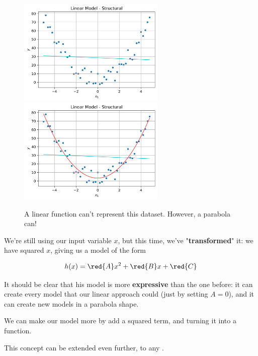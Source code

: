         \begin{figure}[H]
            
            \includegraphics[width=70mm,scale=0.5]{images/feature_images/Structural_Linear_Model.png}
            \includegraphics[width=70mm,scale=0.5]{images/feature_images/Structural_Quad_Model.png}
    
            \caption{A linear function can't represent this dataset. However, a parabola can!}
        \end{figure}
    
        We're still using our input variable $x$, but this time, we've "\textbf{transformed}" it: we have squared $x$, giving us a model of the form
    
        \begin{equation}
            h(x) = \red{A}x^2+\red{B}x+\red{C}
        \end{equation}
    
        It should be clear that his model is more \textbf{expressive} than the one before: it can create every model that our linear approach could (just by setting $A=0$), and it can create new models in a parabola shape.
            \\
    
        \begin{concept}
            We can make our  model more  by add a squared term, and turning it into a  function.
    
            This concept can be extended even further, to any .
        \end{concept}

